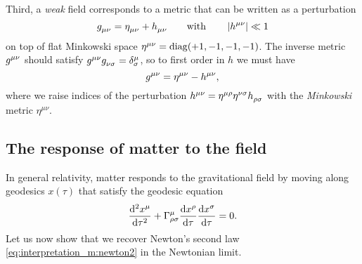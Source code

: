 Third, a \emph{weak} field corresponds to a metric that can be written as a perturbation
\begin{equation}
	g\indices{_\mu_\nu} = \eta\indices{_\mu_\nu} + h\indices{_\mu_\nu}
	\qquad \text{with} \qquad
	\abs{h\indices{^\mu^\nu}} \ll 1
	\label{eq:weak_field_limit:weak_field_metric}
\end{equation}
on top of flat Minkowski space $\eta\indices{^\mu^\nu} = \diag (+1, -1, -1, -1)$.
The inverse metric $g\indices{^\mu^\nu}$ should satisfy $g\indices{^\mu^\nu} g\indices{_\nu_\sigma} = \delta^\mu_\sigma$, so to first order in $h$ we must have
\begin{equation}
	g\indices{^\mu^\nu} = \eta\indices{^\mu^\nu} - h\indices{^\mu^\nu} ,
	\label{eq:weak_field_limit:weak_field_metric_inverse}
\end{equation}
where we raise indices of the perturbation $h\indices{^\mu^\nu} = \eta\indices{^\mu^\rho} \eta\indices{^\nu^\sigma} h\indices{_\rho_\sigma}$ with the \emph{Minkowski} metric $\eta^{\mu\nu}$.

\subsection{The response of matter to the field}

In general relativity, matter responds to the gravitational field by moving along geodesics $x(\tau)$ that satisfy the geodesic equation
\begin{equation}
	\odv[2]{x^\mu}{\tau} + \Gamma^\mu_{\rho \sigma} \odv{x^\rho}{\tau} \odv{x^\sigma}{\tau} = 0 .
	\label{eq:geodesic_duplicate}
\end{equation}
Let us now show that we recover Newton's second law \eqref{eq:interpretation_m:newton2} in the Newtonian limit.

